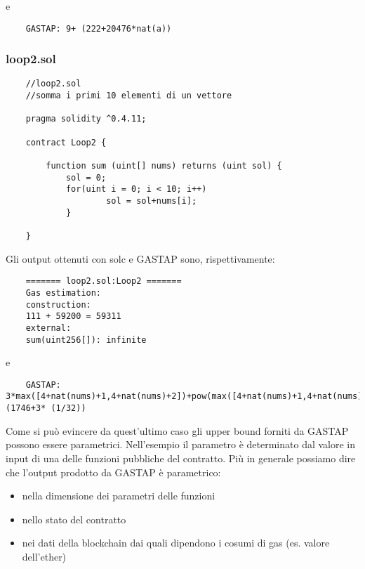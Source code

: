     e \begin{lstlisting}
    GASTAP: 9+ (222+20476*nat(a))
    \end{lstlisting}

    
    
    \subsubsection{loop2.sol}
     
    \begin{minipage}{\linewidth}
    \begin{lstlisting}
    //loop2.sol
    //somma i primi 10 elementi di un vettore

    pragma solidity ^0.4.11;

    contract Loop2 {

        function sum (uint[] nums) returns (uint sol) {
            sol = 0;
            for(uint i = 0; i < 10; i++)
                    sol = sol+nums[i];
            }

    }
    \end{lstlisting}
    \end{minipage}

    
    Gli output ottenuti con solc e GASTAP sono, rispettivamente:
    
    \begin{minipage}{\linewidth}
    \begin{lstlisting}
    ======= loop2.sol:Loop2 =======
    Gas estimation:
    construction:
    111 + 59200 = 59311
    external:
    sum(uint256[]):	infinite
    \end{lstlisting}
    \end{minipage}

    
    e \begin{lstlisting} 
    GASTAP: 3*max([4+nat(nums)+1,4+nat(nums)+2])+pow(max([4+nat(nums)+1,4+nat(nums)+2]),2)/512+(1746+3* (1/32))
      \end{lstlisting}
    
    Come si può evincere da quest'ultimo caso gli upper bound forniti da GASTAP possono essere parametrici. Nell'esempio il parametro è determinato dal valore in input di una delle funzioni pubbliche del contratto.\newline
    \indent Più in generale possiamo dire che l'output prodotto da GASTAP è parametrico:
    \begin{itemize}
     \item nella dimensione dei parametri delle funzioni
     \item nello stato del contratto
     \item nei dati della blockchain dai quali dipendono i cosumi di gas (es. valore dell'ether)
    \end{itemize}


